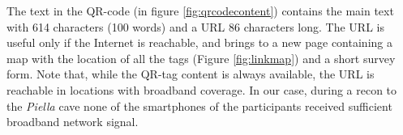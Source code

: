 \documentclass[sustainability,article,submit,pdftex,moreauthors]{Definitions/mdpi}
\begin{document}
The text in the QR-code (in figure \ref{fig:qrcodecontent}) contains the main text with 614 characters (100 words) and a URL 86 characters long. The URL is useful only if the Internet is reachable, and brings to a new page containing a map with the location of all the tags (Figure \ref{fig:linkmap}) and a short survey form. Note that, while the QR-tag content is always available, the URL is reachable in locations with broadband coverage. In our case, during a recon to the {\em Piella} cave none of the smartphones of the participants received sufficient broadband network signal.

\begin{figure}
\end{figure}
\end{document}
